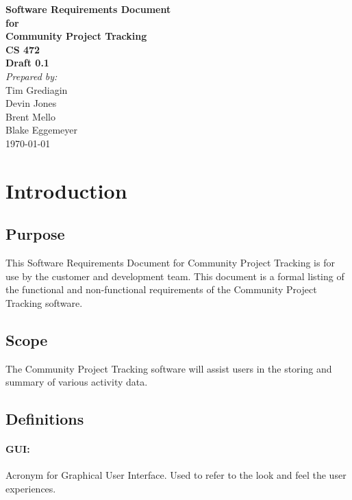 \documentclass[12pt]{article}
\begin{document}
\begin{titlepage}
\begin{flushright} 
{\LARGE \bfseries Software Requirements Document}\\[1.2cm]
{\large \bfseries for}\\[1.2cm]
{\huge \bfseries Community Project Tracking}\\[1.2cm]
{\large \bfseries CS 472}\\
\vfill
{\large \bfseries Draft 0.1}\\[2cm]
\emph{Prepared by:} \\
Tim Grediagin\\
Devin Jones\\
Brent Mello\\
Blake Eggemeyer \\ [3cm]
{\large \today}
\\[2cm]
\end{flushright}
\end{titlepage}
\setcounter{tocdepth}{3}
\setcounter{secnumdepth}{4}
\tableofcontents
\newpage
\section{Introduction}

\subsection{Purpose}
This Software Requirements Document for Community Project Tracking is for use by the customer and development team. This document is a formal listing of the functional and non-functional requirements of the Community Project Tracking software.

\subsection{Scope}
The Community Project Tracking software will assist users in the storing and summary of various activity data.

\subsection{Definitions}

\paragraph{GUI:} Acronym for Graphical User Interface. Used to refer to the look and feel the user experiences.
\end{document}
